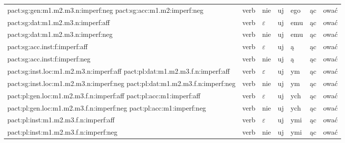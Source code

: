 \documentclass{article}
\begin{document}
\begin{longtable}{p{7cm}|l|l|l|l|l|l}
pact:sg:gen:m1.m2.m3.n:imperf:neg pact:sg:acc:m1.m2:imperf:neg & verb & nie & uj & ego & ąc & ować\\
pact:sg:dat:m1.m2.m3.n:imperf:aff & verb & $\varepsilon$ & uj & emu & ąc & ować\\
pact:sg:dat:m1.m2.m3.n:imperf:neg & verb & nie & uj & emu & ąc & ować\\
pact:sg:acc.inst:f:imperf:aff & verb & $\varepsilon$ & uj & ą & ąc & ować\\
pact:sg:acc.inst:f:imperf:neg & verb & nie & uj & ą & ąc & ować\\
pact:sg:inst.loc:m1.m2.m3.n:imperf:aff pact:pl:dat:m1.m2.m3.f.n:imperf:aff & verb & $\varepsilon$ & uj & ym & ąc & ować\\
pact:sg:inst.loc:m1.m2.m3.n:imperf:neg pact:pl:dat:m1.m2.m3.f.n:imperf:neg & verb & nie & uj & ym & ąc & ować\\
pact:pl:gen.loc:m1.m2.m3.f.n:imperf:aff pact:pl:acc:m1:imperf:aff & verb & $\varepsilon$ & uj & ych & ąc & ować\\
pact:pl:gen.loc:m1.m2.m3.f.n:imperf:neg pact:pl:acc:m1:imperf:neg & verb & nie & uj & ych & ąc & ować\\
pact:pl:inst:m1.m2.m3.f.n:imperf:aff & verb & $\varepsilon$ & uj & ymi & ąc & ować\\
pact:pl:inst:m1.m2.m3.f.n:imperf:neg & verb & nie & uj & ymi & ąc & ować\\
\end{longtable}
\end{document}
